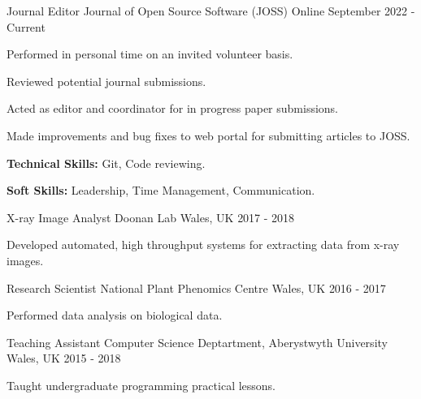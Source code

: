 \begin{cventries}
  \cventry
    {Journal Editor} %
    {Journal of Open Source Software (JOSS)} %
    {Online} %
    {September 2022 - Current} %
    {
      \begin{cvitems} %
        \item {Performed in personal time on an invited volunteer basis.}
        \item {Reviewed potential journal submissions.}
        \item {Acted as editor and coordinator for in progress paper submissions.}
        \item {Made improvements and bug fixes to web portal for submitting articles to JOSS.}
        \item {\textbf{Technical Skills:} Git, Code reviewing.}
        \item {\textbf{Soft Skills:} Leadership, Time Management, Communication.}
      \end{cvitems}
    }


  \cventry
    {X-ray Image Analyst} %
    {Doonan Lab} %
    {Wales, UK} %
    {2017 - 2018 } %
    {  \begin{cvitems} %
        \item {Developed automated, high throughput systems for extracting data from x-ray images.}
      \end{cvitems}  
      }

  \cventry
    {Research Scientist} %
    {National Plant Phenomics Centre} %
    {Wales, UK} %
    {2016 - 2017 } %
        {  \begin{cvitems} %
        \item {Performed data analysis on biological data.}
      \end{cvitems}  
      }

      \cventry
    {Teaching Assistant} %
    {Computer Science Deptartment, Aberystwyth University} %
    {Wales, UK} %
    {2015 - 2018} %
        {  \begin{cvitems} %
        \item {Taught undergraduate programming practical lessons.}
      \end{cvitems}  
      }


\end{cventries}
